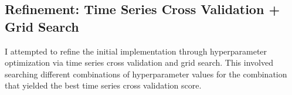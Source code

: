 \documentclass{article}
\begin{document}




\subsection{Refinement: Time Series Cross Validation + Grid Search}

I attempted to refine the initial implementation through hyperparameter optimization via time series cross validation and grid search. This involved searching different combinations of hyperparameter values for the combination that yielded the best time series cross validation score.  
\end{document}
